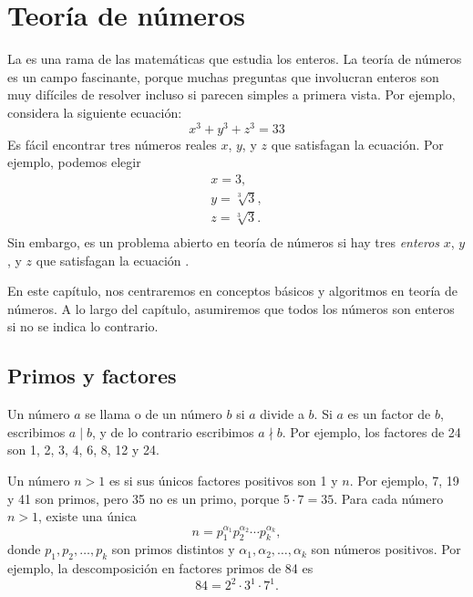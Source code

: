 \chapter{Teoría de números}


La  es una rama de las matemáticas
que estudia los enteros.
La teoría de números es un campo fascinante,
porque muchas preguntas que involucran enteros
son muy difíciles de resolver incluso si parecen
simples a primera vista. Por ejemplo, considera la
siguiente ecuación:
\[x^3 + y^3 + z^3 = 33\]
Es fácil encontrar tres números reales $x$, $y$, y $z$
que satisfagan la ecuación.
Por ejemplo, podemos elegir
\[
    \begin{array}{lcl}
        x = 3,           \\
        y = \sqrt[3]{3}, \\
        z = \sqrt[3]{3}. \\
    \end{array}
\]
Sin embargo, es un problema abierto en teoría de números
si hay tres
\emph{enteros} $x$, $y$, y $z$
que satisfagan la ecuación \cite{bec07}.

En este capítulo, nos centraremos en conceptos básicos
y algoritmos en teoría de números.
A lo largo del capítulo, asumiremos que todos los números
son enteros si no se indica lo contrario.

\section{Primos y factores}


Un número $a$ se llama  o  de un número $b$
si $a$ divide a $b$.
Si $a$ es un factor de $b$,
escribimos $a \mid b$, y de lo contrario escribimos $a \nmid b$.
Por ejemplo, los factores de 24 son
1, 2, 3, 4, 6, 8, 12 y 24.


Un número $n>1$ es 
si sus únicos factores positivos son 1 y $n$.
Por ejemplo, 7, 19 y 41 son primos,
pero 35 no es un primo, porque $5 \cdot 7 = 35$.
Para cada número $n>1$, existe una única
\[ n = p_1^{\alpha_1} p_2^{\alpha_2} \cdots p_k^{\alpha_k},\]
donde $p_1,p_2,\ldots,p_k$ son primos distintos y
$\alpha_1,\alpha_2,\ldots,\alpha_k$ son números positivos.
Por ejemplo, la descomposición en factores primos de 84 es
\[84 = 2^2 \cdot 3^1 \cdot 7^1.\]


